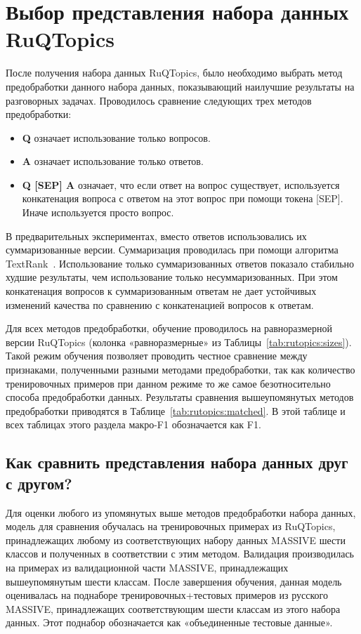 \section{Выбор представления набора данных {RuQTopics}}\label{rutopics:prepr}

После получения набора данных {RuQTopics}, было необходимо выбрать метод предобработки данного набора данных, показывающий наилучшие результаты на разговорных задачах. Проводилось сравнение следующих трех методов предобработки:

\begin{itemize}
   \item \textbf{Q} означает использование только вопросов.
   \item \textbf{A} означает использование только ответов.
   \item \textbf{Q [SEP] A} означает, что если ответ на вопрос существует, используется конкатенация вопроса с ответом на этот вопрос при помощи токена [SEP]. Иначе используется просто вопрос.  
\end{itemize}

В предварительных экспериментах, вместо ответов использовались их суммаризованные версии. Суммаризация проводилась при помощи алгоритма TextRank~\cite{summarizer}. Использование только суммаризованных ответов показало стабильно худшие результаты, чем использование только несуммаризованных. При этом конкатенация вопросов к суммаризованным ответам не дает устойчивых изменений качества по сравнению с конкатенацией вопросов к ответам.

Для всех методов предобработки, обучение проводилось на равноразмерной версии {RuQTopics} (колонка «равноразмерные» из Таблицы~\ref{tab:rutopics:sizes}).
Такой режим обучения позволяет проводить честное сравнение между признаками, полученными разными методами предобработки, так как количество тренировочных примеров при данном режиме то же самое безотносительно способа предобработки данных. Результаты сравнения вышеупомянутых методов предобработки приводятся в Таблице~\ref{tab:rutopics:matched}. В этой таблице и всех таблицах этого раздела макро-F1 обозначается как F1.
 \subsection{Как сравнить представления набора данных друг с другом?}
Для оценки любого из упомянутых выше методов предобработки набора данных, модель для сравнения обучалась на тренировочных примерах из {RuQTopics}, принадлежащих любому из соответствующих набору данных {MASSIVE} шести классов и полученных в соответствии с этим методом. Валидация производилась на примерах из валидационной части MASSIVE, принадлежащих вышеупомянутым шести классам. После завершения обучения, данная модель оценивалась на поднаборе тренировочных+тестовых примеров из русского {MASSIVE}, принадлежащих соответствующим шести классам из этого набора данных. Этот поднабор обозначается как «объединенные тестовые данные».

